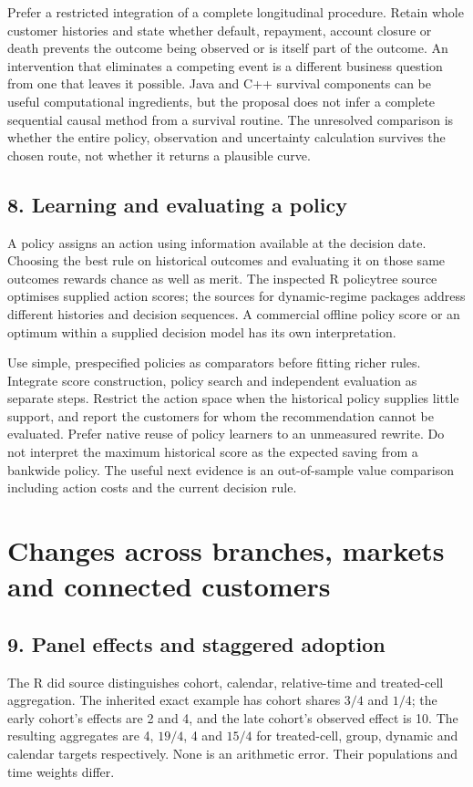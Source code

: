 Prefer a restricted integration of a complete longitudinal procedure. Retain
whole customer histories and state whether default, repayment, account closure
or death prevents the outcome being observed or is itself part of the outcome.
An intervention that eliminates a competing event is a different business
question from one that leaves it possible. Java and C++ survival components
can be useful computational ingredients, but the proposal does not infer a
complete sequential causal method from a survival routine. The unresolved
comparison is whether the entire policy, observation and uncertainty calculation
survives the chosen route, not whether it returns a plausible curve.

\subsection{8. Learning and evaluating a policy}
A policy assigns an action using information available at the decision date.
Choosing the best rule on historical outcomes and evaluating it on those same
outcomes rewards chance as well as merit. The inspected R policytree source
optimises supplied action scores; the sources for dynamic-regime packages
address different histories and decision sequences. A commercial offline
policy score or an optimum within a supplied decision model has its own
interpretation.
\citep{exec24_policiesr_policytree,exec24_policiesr_dtrreg,
exec24_policiesr_polle,exec16_cp_bayesfusion,exec13_ch_stata}

Use simple, prespecified policies as comparators before fitting richer rules.
Integrate score construction, policy search and independent evaluation as
separate steps. Restrict the action space when the historical policy supplies
little support, and report the customers for whom the recommendation cannot
be evaluated. Prefer native reuse of policy learners to an unmeasured rewrite.
Do not interpret the maximum historical score as the expected saving from a
bankwide policy. The useful next evidence is an out-of-sample value comparison
including action costs and the current decision rule.

\section{Changes across branches, markets and connected customers}

\subsection{9. Panel effects and staggered adoption}
The R did source distinguishes cohort, calendar, relative-time and treated-cell
aggregation. The inherited exact example has cohort shares $3/4$ and $1/4$;
the early cohort's effects are 2 and 4, and the late cohort's observed effect
is 10. The resulting aggregates are 4, $19/4$, 4 and $15/4$ for treated-cell,
group, dynamic and calendar targets respectively. None is an arithmetic error.
Their populations and time weights differ.
\citep{exec24_panelr_did}

